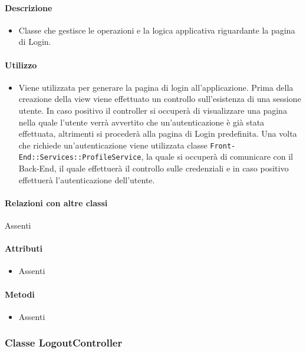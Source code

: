 \paragraph*{Descrizione}
\begin{itemize}
\item[] Classe che gestisce le operazioni e la logica applicativa riguardante la pagina di Login.
\end{itemize}

\paragraph*{Utilizzo}
\begin{itemize}
\item[] Viene utilizzata per generare la pagina di login all'applicazione. Prima della creazione della view viene effettuato un controllo sull'esistenza di una sessione utente. In caso positivo il controller si occuperà di visualizzare una pagina nella quale l'utente verrà avvertito che un'autenticazione è già stata effettuata, altrimenti si procederà alla pagina di Login predefinita. Una volta che richiede un'autenticazione viene utilizzata classe \texttt{Front-End::Services::ProfileService}, la quale si occuperà di comunicare con il Back-End, il quale effettuerà il controllo sulle credenziali e in caso positivo effettuerà l'autenticazione dell'utente.
\end{itemize}

\paragraph*{Relazioni con altre classi}
Assenti

\paragraph*{Attributi}
\begin{itemize}
\item[] Assenti
\end{itemize}

\paragraph*{Metodi}
\begin{itemize}
\item[] Assenti
\end{itemize}

\subsubsection{Classe LogoutController}

